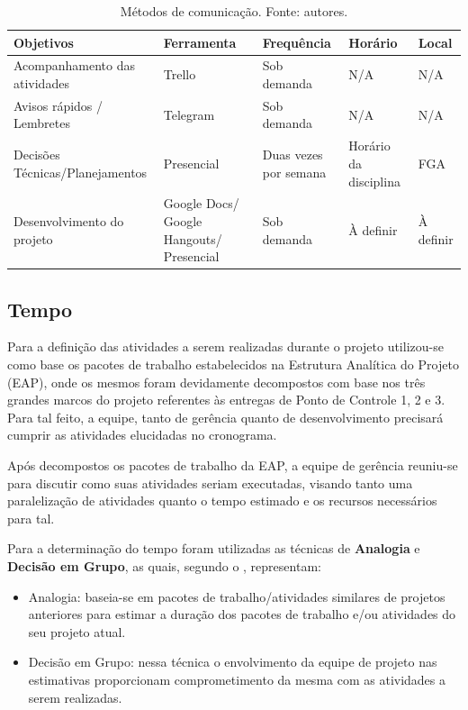      \begin{table}[!htbp]
        \begin{center}
          \caption{\label{tab:com}Métodos de comunicação. Fonte: autores.}
          \begin{tabular}{|p{4cm}|p{4cm}|p{3cm}|p{3cm}|p{2cm}|}
            \hline
            \textbf{Objetivos} & \textbf{Ferramenta} & \textbf{Frequência} & \textbf{Horário} & \textbf{Local}\\\hline\hline
            Acompanhamento das atividades & Trello & Sob demanda & N/A & N/A\\\hline
            Avisos rápidos / Lembretes & Telegram & Sob demanda & N/A & N/A\\\hline
            Decisões Técnicas/Planejamentos & Presencial & Duas vezes por semana & Horário da disciplina & FGA\\\hline
            Desenvolvimento do projeto & Google Docs/ Google Hangouts/ Presencial & Sob demanda & À definir & À definir\\\hline
          \end{tabular}
        \end{center}
      \end{table}

    \subsection{Tempo}

      Para a definição das atividades a serem realizadas durante o
      projeto utilizou-se como base os pacotes de trabalho estabelecidos
      na Estrutura Analítica do Projeto (EAP), onde os mesmos foram devidamente
      decompostos com base nos três grandes marcos do projeto referentes
      às entregas de Ponto de Controle 1, 2 e 3. Para tal feito, a equipe,
      tanto de gerência quanto de desenvolvimento precisará cumprir
      as atividades elucidadas no cronograma.

      Após decompostos os pacotes de trabalho da EAP, a equipe
      de gerência reuniu-se para discutir como suas atividades seriam
      executadas, visando tanto uma paralelização de atividades quanto
      o tempo estimado e os recursos necessários para tal.

      Para a determinação do tempo foram utilizadas as
      técnicas de \textbf{Analogia} e \textbf{Decisão em Grupo},
      as quais, segundo o \cite{PMI2012}, representam:

      \begin{itemize}
        \item Analogia: baseia-se em pacotes de trabalho/atividades similares
        de projetos anteriores para estimar a duração dos pacotes de trabalho
        e/ou atividades do seu projeto atual.
        \item Decisão em Grupo: nessa técnica o envolvimento da equipe de projeto
        nas estimativas proporcionam comprometimento da mesma com as
        atividades a serem realizadas.
      \end{itemize}

